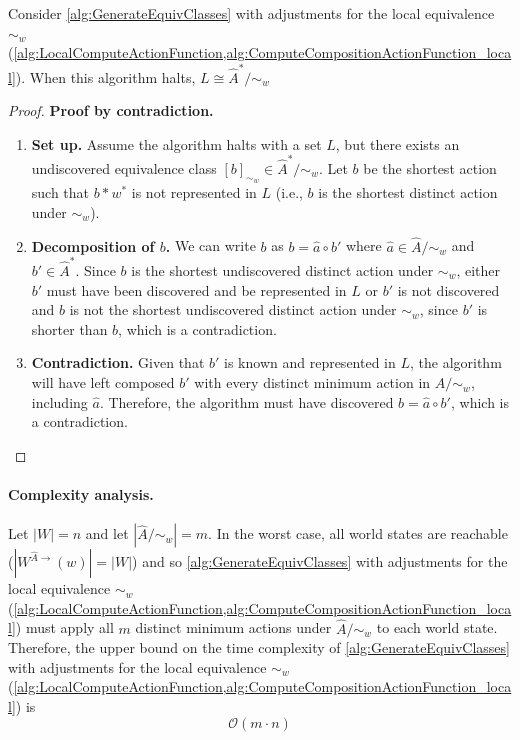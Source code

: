 \begin{proposition}
    Consider \cref{alg:GenerateEquivClasses} with adjustments for the local equivalence $\sim_{w}$ (\cref{alg:LocalComputeActionFunction,alg:ComputeCompositionActionFunction_local}).
    When this algorithm halts, $L \cong \hat{A}^{*}/\sim_{w}$
\end{proposition}
\begin{proof}
    \textbf{Proof by contradiction.}
\begin{enumerate}[(1)]
    \item \textbf{Set up.}
    Assume the algorithm halts with a set $L$, but there exists an undiscovered equivalence class $[b]_{\sim_{w}} \in \hat{A}^{*}/\sim_{w}$.
    Let $b$ be the shortest action such that $b \ast w^{*}$ is not represented in $L$ (i.e., $b$ is the shortest distinct action under $\sim_{w}$).

    \item \textbf{Decomposition of $b$.}
    We can write $b$ as $b = \hat{a} \circ b'$ where $\hat{a} \in \hat{A}/\sim_{w}$ and $b' \in \hat{A}^{\ast}$.
    Since $b$ is the shortest undiscovered distinct action under $\sim_{w}$, either $b'$ must have been discovered and be represented in $L$ or $b'$ is not discovered and $b$ is not the shortest undiscovered distinct action under $\sim_{w}$, since $b'$ is shorter than $b$, which is a contradiction.

    \item \textbf{Contradiction.}
    Given that $b'$ is known and represented in $L$, the algorithm will have left composed $b'$ with every distinct minimum action in $\hat{A}/\sim_{w}$, including $\hat{a}$.
    Therefore, the algorithm must have discovered $b = \hat{a} \circ b'$, which is a contradiction.
\end{enumerate}
\end{proof}

\paragraph{Complexity analysis.}
Let $|W|=n$ and let $|\hat{A}/\sim_{w}|=m$.
In the worst case, all world states are reachable ($|W^{\hat{A}\to}(w)| = |W|$) and so \cref{alg:GenerateEquivClasses} with adjustments for the local equivalence $\sim_{w}$ (\cref{alg:LocalComputeActionFunction,alg:ComputeCompositionActionFunction_local}) must apply all $m$ distinct minimum actions under $\hat{A}/\sim_{w}$ to each world state.
Therefore, the upper bound on the time complexity of \cref{alg:GenerateEquivClasses} with adjustments for the local equivalence $\sim_{w}$ (\cref{alg:LocalComputeActionFunction,alg:ComputeCompositionActionFunction_local}) is
\begin{equation}
    \mathcal{O}(m \cdot n)
\end{equation}


